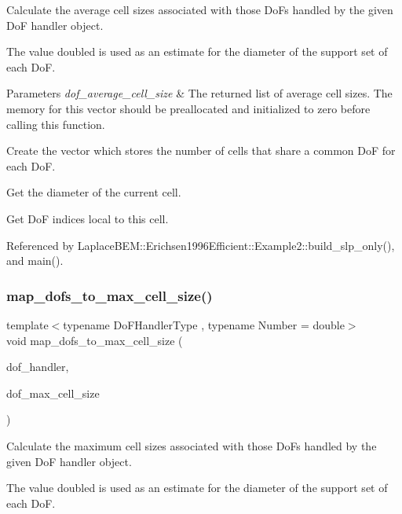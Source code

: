 Calculate the average cell sizes associated with those Do\+Fs handled by the given DoF handler object.

The value doubled is used as an estimate for the diameter of the support set of each DoF.


\begin{DoxyParams}{Parameters}
{\em dof\+\_\+average\+\_\+cell\+\_\+size} & The returned list of average cell sizes. The memory for this vector should be preallocated and initialized to zero before calling this function. \\
\hline
\end{DoxyParams}
Create the vector which stores the number of cells that share a common DoF for each DoF.

Get the diameter of the current cell.

Get DoF indices local to this cell.

Referenced by Laplace\+B\+E\+M\+::\+Erichsen1996\+Efficient\+::\+Example2\+::build\+\_\+slp\+\_\+only(), and main().

\mbox{\label{group__hierarchical__matrices_ga1eee708f9eb5b9e9a2d8031c60c5d315}} 
\subsubsection{\texorpdfstring{map\+\_\+dofs\+\_\+to\+\_\+max\+\_\+cell\+\_\+size()}{map\_dofs\_to\_max\_cell\_size()}}
{\footnotesize\ttfamily template$<$typename Do\+F\+Handler\+Type , typename Number  = double$>$ \\
void map\+\_\+dofs\+\_\+to\+\_\+max\+\_\+cell\+\_\+size (\begin{DoxyParamCaption}\item[{const Do\+F\+Handler\+Type \&}]{dof\+\_\+handler,  }\item[{std\+::vector$<$ Number $>$ \&}]{dof\+\_\+max\+\_\+cell\+\_\+size }\end{DoxyParamCaption})}

Calculate the maximum cell sizes associated with those Do\+Fs handled by the given DoF handler object.

The value doubled is used as an estimate for the diameter of the support set of each DoF.


